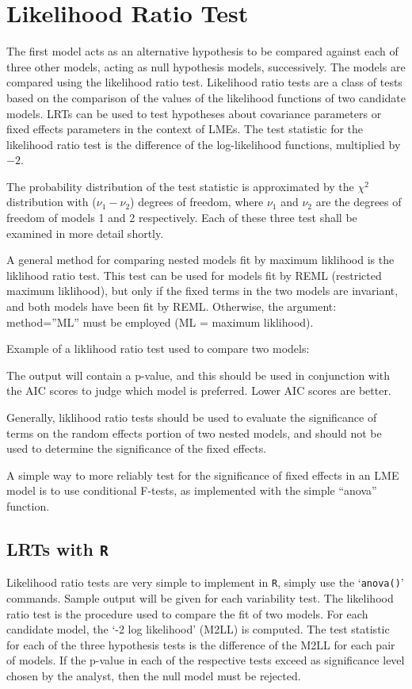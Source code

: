 \section{Likelihood Ratio Test}
The first model acts as an alternative hypothesis to be compared against each of three other models, acting as null hypothesis models, successively. The models are compared using the likelihood ratio test. Likelihood ratio tests are a class of tests based on the comparison of the values of the likelihood functions of two candidate models. LRTs can be used to test hypotheses about covariance parameters or fixed effects parameters in the context of LMEs. The test statistic for the likelihood ratio test is the difference of the log-likelihood functions, multiplied by $-2$.

The probability distribution of the test statistic is approximated by the $\chi^2$ distribution with ($\nu_{1} - \nu_{2}$) degrees of freedom, where $\nu_{1}$ and $\nu_{2}$ are the degrees of freedom of models 1 and 2 respectively. Each of these three test shall be examined in more detail shortly.



A general method for comparing nested models fit by maximum liklihood is the liklihood ratio 
test. This test can be used for models fit by REML (restricted maximum liklihood), but only if the 
fixed terms in the two models are invariant, and both models have been fit by REML. Otherwise, 
the argument: method=”ML” must be employed (ML = maximum liklihood). 

Example of a liklihood ratio test used to compare two models: 



The output will contain a p-value, and this should be used in conjunction with the AIC scores to 
judge which model is preferred. Lower AIC scores are better. 

Generally, liklihood ratio tests should be used to evaluate the significance of terms on the 
random effects portion of two nested models, and should not be used to determine the 
significance of the fixed effects. 

A simple way to more reliably test for the significance of fixed effects in an LME model is to use 
conditional F-tests, as implemented with the simple “anova” function. 







\subsection{LRTs with \texttt{R}}
Likelihood ratio tests are very simple to implement in \texttt{R}, simply use the `\texttt{anova()}'
commands. Sample output will be given for each variability test. The likelihood ratio
test is the procedure used to compare the fit of two models. For each candidate model,
the `-2 log likelihood' (M2LL) is computed. The test statistic for each of the three
hypothesis tests is the difference of the M2LL for each pair of models. If the p-value
in each of the respective tests exceed as significance level chosen by the analyst, then
the null model must be rejected.

